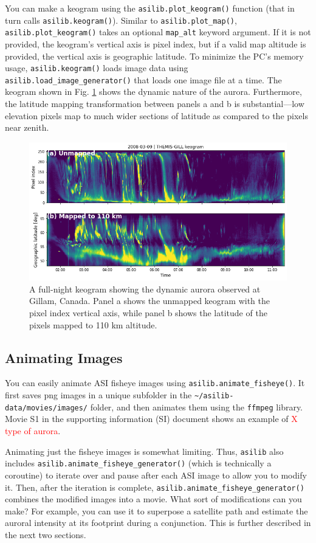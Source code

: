 \documentclass[draft]{agujournal2019}
\begin{document}
You can make a keogram using the \verb|asilib.plot_keogram()| function (that in turn calls \verb|asilib.keogram()|). Similar to \verb|asilib.plot_map()|, \verb|asilib.plot_keogram()| takes an optional \verb|map_alt| keyword argument. If it is not provided, the keogram's vertical axis is pixel index, but if a valid map altitude is provided, the vertical axis is geographic latitude. To minimize the PC's memory usage, \verb|asilib.keogram()| loads image data using \verb|asilib.load_image_generator()| that loads one image file at a time. The keogram shown in Fig. \ref{fig3} shows the dynamic nature of the aurora. Furthermore, the latitude  mapping transformation between panels a and b is substantial---low elevation pixels map to much wider sections of latitude as compared to the pixels near zenith.

\begin{figure}
      \includegraphics[width=\textwidth]{figures/fig3.png}
      \caption{A full-night keogram showing the dynamic aurora observed at Gillam, Canada. Panel a shows the unmapped keogram with the pixel index vertical axis, while panel b shows the latitude of the pixels mapped to 110 km altitude.}
      \label{fig3}
\end{figure}


\subsection{Animating Images}
You can easily animate ASI fisheye images using \verb|asilib.animate_fisheye()|. It first saves png images in a unique subfolder in the \verb|~/asilib-data/movies/images/| folder, and then animates them using the \verb|ffmpeg| library. Movie S1 in the supporting information (SI) document shows an example of \textcolor{red}{X type of aurora}.

Animating just the fisheye images is somewhat limiting. Thus, \verb|asilib| also includes \verb|asilib.animate_fisheye_generator()| (which is technically a coroutine) to iterate over and pause after each ASI image to allow you to modify it. Then, after the iteration is complete, \verb|asilib.animate_fisheye_generator()| combines the modified images into a movie. What sort of modifications can you make? For example, you can use it to superpose a satellite path and estimate the auroral intensity at its footprint during a conjunction. This is further described in the next two sections.
\end{document}

